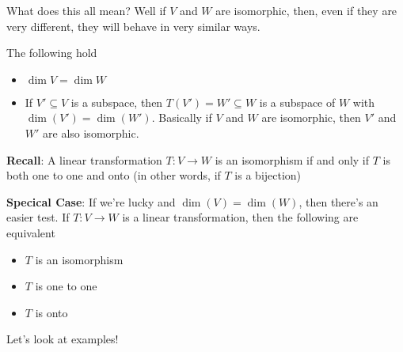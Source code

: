 \documentclass[12pt]{article}
\begin{document}

  What does this all mean? Well if $V$ and $W$ are isomorphic, then, even if
  they are very different, they will behave in very similar ways.

  The following hold

  \begin{itemize}
    \item $\dim V = \dim W$
    \item If $V' \subseteq V$ is a subspace, then $T(V') = W' \subseteq W$ is a
      subspace of $W$ with $\dim(V') = \dim(W')$. Basically if $V$ and $W$ are
      isomorphic, then $V'$ and $W'$ are also isomorphic.
  \end{itemize}

  {\bf Recall}: A linear transformation $T: V \to W$ is an isomorphism if and
  only if $T$ is both one to one and onto (in other words, if $T$ is a bijection)

  {\bf Specical Case}: If we're lucky and $\dim(V) = \dim(W)$, then there's an
  easier test. If $T: V \to W$ is a linear transformation, then the following
  are equivalent

  \begin{itemize}
    \item $T$ is an isomorphism
    \item $T$ is one to one
    \item $T$ is onto
  \end{itemize}

  Let's look at examples!
\end{document}
